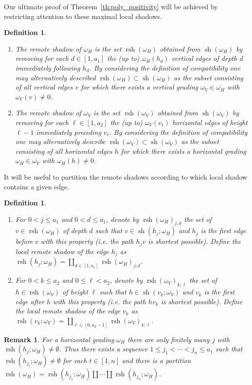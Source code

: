 \documentclass{amsart}
\newtheorem{definition}[theorem]{Definition}
\newtheorem{remark}[theorem]{Remark}
\newcommand{\rsh}{\operatorname{rsh}}
\newcommand{\sh}{\operatorname{sh}}
\newenvironment{enumeratea}{\begin{enumerate}[\upshape (a)]}
                           {\end{enumerate}}
\begin{document}
 Our ultimate proof of Theorem~\ref{th:poly_positivity} will be achieved by restricting attention to these maximal local shadows.

 \begin{definition}\mbox{}
  \begin{enumeratea}
   \item The \emph{remote shadow} of $\omega_H$ is the set $\rsh(\omega_H)$ obtained from $\sh(\omega_H)$ by removing for each $d\in[1,a_1]$ the (up to) $\omega_H(h_d)$ vertical edges of depth $d$ immediately following $h_d$.  By considering the definition of compatibility one may alternatively described $\rsh(\omega_H)\subset\sh(\omega_H)$ as the subset consisting of all vertical edges $v$ for which there exists a vertical grading $\omega_V\in\overline{\omega_H}$ with $\omega_V(v)\ne0$.
   \item The \emph{remote shadow} of $\omega_V$ is the set $\rsh(\omega_V)$ obtained from $\sh(\omega_V)$ by removing for each $\ell\in[1,a_2]$ the (up to) $\omega_V(v_\ell)$ horizontal edges of height $\ell-1$ immediately preceding $v_\ell$.  By considering the definition of compatibility one may alternatively describe $\rsh(\omega_V)\subset\sh(\omega_V)$ as the subset consisting of all horizontal edges $h$ for which there exists a horizontal grading $\omega_H\in\overline{\omega_V}$ with $\omega_H(h)\ne0$.
  \end{enumeratea}
 \end{definition}
 
 It will be useful to partition the remote shadows according to which local shadow contains a given edge. 
 \begin{definition}\label{def:remote_shadows}\mbox{}
  \begin{enumeratea}
   \item For $0<j\le a_1$ and $0<d\le a_1$, denote by $\rsh(\omega_H)_{j;d}$ the set of $v\in\rsh(\omega_H)$ of depth $d$ such that $v\in\sh(h_j;\omega_H)$ and $h_j$ is the first edge before $v$ with this property (i.e. the path $h_jv$ is shortest possible).  Define the \emph{local remote shadow} of the edge $h_j$ as $\rsh(h_j;\omega_H)=\coprod\limits_{d\in[1,a_1]}\rsh(\omega_H)_{j;d}$.
   \item For $0<k\le a_2$ and $0\le \ell<a_2$, denote by $\rsh(\omega_V)_{k;\ell}$ the set of $h\in\rsh(\omega_V)$ of height $\ell$ such that $h\in\sh(v_k;\omega_V)$ and $v_k$ is the first edge after $h$ with this property (i.e. the path $hv_k$ is shortest possible).  Define the \emph{local remote shadow} of the edge $v_k$ as $\rsh(v_k;\omega_V)=\coprod\limits_{\ell\in[0,a_2-1]}\rsh(\omega_V)_{k;\ell}$.
  \end{enumeratea}
 \end{definition}
 \begin{remark}\label{rem:remote_shadow_decomposition}
  For a horizontal grading $\omega_H$ there are only finitely many $j$ with $\rsh(h_j;\omega_H)\ne\emptyset$.  Thus there exists a sequence $1\le j_1<\cdots<j_n\le a_1$ such that $\rsh(h_{j_t};\omega_H)\ne\emptyset$ for each $t\in[1,n]$ and there is a partition $\rsh(\omega_H)=\rsh(h_{j_1};\omega_H)\amalg\cdots\amalg\rsh(h_{j_n};\omega_H)$.
 \end{remark}
\end{document}
